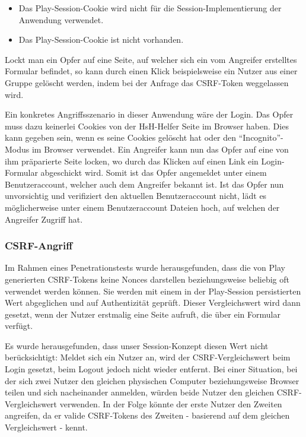 \documentclass[12pt,DIV14,BCOR10mm,a4paper,parskip=half-,headsepline,headinclude,english,ngerman,bibliography=totocnumbered]{scrreprt}
\begin{document}
  \begin{itemize}
    \item Das Play-Session-Cookie wird nicht für die Session-Implementierung der Anwendung verwendet.
    \item Das Play-Session-Cookie ist nicht vorhanden.
  \end{itemize}

Lockt man ein Opfer auf eine Seite, auf welcher sich ein vom Angreifer erstelltes Formular befindet, so kann durch einen Klick beispielsweise ein Nutzer aus einer Gruppe gelöscht werden, indem bei der Anfrage das CSRF-Token weggelassen wird.

Ein konkretes Angriffsszenario in dieser Anwendung wäre der Login. Das Opfer muss dazu keinerlei Cookies von der HsH-Helfer Seite im Browser haben. Dies kann gegeben sein, wenn es seine Cookies gelöscht hat oder den \enquote{Incognito}-Modus im Browser verwendet. Ein Angreifer kann nun das Opfer auf eine von ihm präparierte Seite locken, wo durch das Klicken auf einen Link ein Login-Formular abgeschickt wird. Somit ist das Opfer angemeldet unter einem Benutzeraccount, welcher auch dem Angreifer bekannt ist. Ist das Opfer nun unvorsichtig und verifiziert den aktuellen Benutzeraccount nicht, lädt es möglicherweise unter einem Benutzeraccount Dateien hoch, auf welchen der Angreifer Zugriff hat.

\subsubsection{CSRF-Angriff}
Im Rahmen eines Penetrationstests wurde herausgefunden, dass die von Play generierten CSRF-Tokens keine Nonces darstellen beziehungsweise beliebig oft verwendet werden können. Sie werden mit einem in der Play-Session persistierten Wert abgeglichen und auf Authentizität geprüft. Dieser Vergleichswert wird dann gesetzt, wenn der Nutzer erstmalig eine Seite aufruft, die über ein Formular verfügt.

Es wurde herausgefunden, dass unser Session-Konzept diesen Wert nicht berücksichtigt: Meldet sich ein Nutzer an, wird der CSRF-Vergleichswert beim Login gesetzt, beim Logout jedoch nicht wieder entfernt. Bei einer Situation, bei der sich zwei Nutzer den gleichen physischen Computer beziehungsweise Browser teilen und sich nacheinander anmelden, würden beide Nutzer den gleichen CSRF-Vergleichswert verwenden. In der Folge könnte der erste Nutzer den Zweiten angreifen, da er valide CSRF-Tokens des Zweiten - basierend auf dem gleichen Vergleichswert - kennt.
\end{document}
